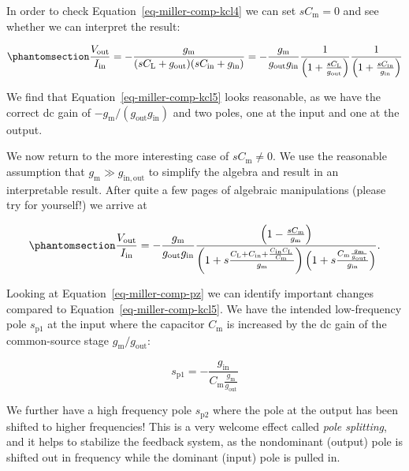 \documentclass[
  a4paper,
  DIV=11,
  numbers=noendperiod]{scrartcl}
\begin{document}
In order to check Equation~\ref{eq-miller-comp-kcl4} we can set
\(s C_\mathrm{m} = 0\) and see whether we can interpret the result:

\begin{equation}\phantomsection\label{eq-miller-comp-kcl5}{
\frac{V_\mathrm{out}}{I_\mathrm{in}} = -\frac{g_\mathrm{m}}{(s C_\mathrm{L} + g_\mathrm{out})(s C_\mathrm{in} + g_\mathrm{in})} = -\frac{g_\mathrm{m}}{g_\mathrm{out} g_\mathrm{in}}
\frac{1}{\left( 1 + \frac{s C_\mathrm{L}}{g_\mathrm{out}} \right)}
\frac{1}{\left( 1 + \frac{s C_\mathrm{in}}{g_\mathrm{in}} \right)}
}\end{equation}

We find that Equation~\ref{eq-miller-comp-kcl5} looks reasonable, as we
have the correct dc gain of
\(-g_\mathrm{m}/(g_\mathrm{out} g_\mathrm{in})\) and two poles, one at
the input and one at the output.

We now return to the more interesting case of \(s C_\mathrm{m} \neq 0\).
We use the reasonable assumption that
\(g_\mathrm{m}\gg g_\mathrm{in,out}\) to simplify the algebra and result
in an interpretable result. After quite a few pages of algebraic
manipulations (please try for yourself!) we arrive at

\begin{equation}\phantomsection\label{eq-miller-comp-pz}{
\frac{V_\mathrm{out}}{I_\mathrm{in}} = -\frac{g_\mathrm{m}}{g_\mathrm{out} g_\mathrm{in}}
\frac{\left( 1 - \frac{s C_\mathrm{m}}{g_\mathrm{m}} \right)}
{
\left( 1 + s \frac{C_\mathrm{L} + C_\mathrm{in} + \frac{C_\mathrm{in} C_\mathrm{L}}{C_\mathrm{m}}}{g_\mathrm{m}} \right)
\left( 1 + s \frac{C_\mathrm{m} \frac{g_\mathrm{m}}{g_\mathrm{out}}}{g_\mathrm{in}} \right)
}.
}\end{equation}

Looking at Equation~\ref{eq-miller-comp-pz} we can identify important
changes compared to Equation~\ref{eq-miller-comp-kcl5}. We have the
intended low-frequency pole \(s_\mathrm{p1}\) at the input where the
capacitor \(C_\mathrm{m}\) is increased by the dc gain of the
common-source stage \(g_\mathrm{m}/ g_\mathrm{out}\):

\[
s_\mathrm{p1} = -\frac{g_\mathrm{in}}{C_\mathrm{m} \frac{g_\mathrm{m}}{g_\mathrm{out}}}
\]

We further have a high frequency pole \(s_\mathrm{p2}\) where the pole
at the output has been shifted to higher frequencies! This is a very
welcome effect called \emph{pole splitting}, and it helps to stabilize
the feedback system, as the nondominant (output) pole is shifted out in
frequency while the dominant (input) pole is pulled in.
\end{document}
